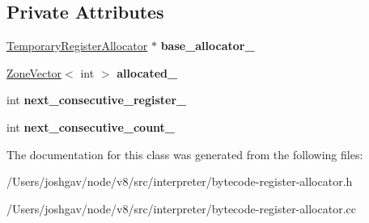 \subsection*{Private Attributes}
\begin{DoxyCompactItemize}
\item 
\hyperlink{classv8_1_1internal_1_1interpreter_1_1_temporary_register_allocator}{Temporary\+Register\+Allocator} $\ast$ {\bfseries base\+\_\+allocator\+\_\+}\hypertarget{classv8_1_1internal_1_1interpreter_1_1_bytecode_register_allocator_aa19f65d4b646da2532d086b8a1def9d5}{}\label{classv8_1_1internal_1_1interpreter_1_1_bytecode_register_allocator_aa19f65d4b646da2532d086b8a1def9d5}

\item 
\hyperlink{classv8_1_1internal_1_1_zone_vector}{Zone\+Vector}$<$ int $>$ {\bfseries allocated\+\_\+}\hypertarget{classv8_1_1internal_1_1interpreter_1_1_bytecode_register_allocator_a869118bc2c62d4699bead3b8bb68aa12}{}\label{classv8_1_1internal_1_1interpreter_1_1_bytecode_register_allocator_a869118bc2c62d4699bead3b8bb68aa12}

\item 
int {\bfseries next\+\_\+consecutive\+\_\+register\+\_\+}\hypertarget{classv8_1_1internal_1_1interpreter_1_1_bytecode_register_allocator_a37aeccc0d9da35fadf0d60870f6ffb08}{}\label{classv8_1_1internal_1_1interpreter_1_1_bytecode_register_allocator_a37aeccc0d9da35fadf0d60870f6ffb08}

\item 
int {\bfseries next\+\_\+consecutive\+\_\+count\+\_\+}\hypertarget{classv8_1_1internal_1_1interpreter_1_1_bytecode_register_allocator_adc870d8567a285da6df4768e6c456cfe}{}\label{classv8_1_1internal_1_1interpreter_1_1_bytecode_register_allocator_adc870d8567a285da6df4768e6c456cfe}

\end{DoxyCompactItemize}


The documentation for this class was generated from the following files\+:\begin{DoxyCompactItemize}
\item 
/\+Users/joshgav/node/v8/src/interpreter/bytecode-\/register-\/allocator.\+h\item 
/\+Users/joshgav/node/v8/src/interpreter/bytecode-\/register-\/allocator.\+cc\end{DoxyCompactItemize}
